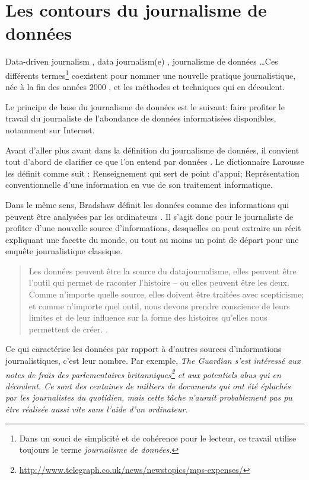 
\chapter{Les contours du journalisme de données}


\og Data-driven journalism \fg, \og data journalism(e) \fg, \og journalisme de données
 \fg\dots Ces différents 
termes\footnote{Dans un souci de simplicité et de cohérence pour le lecteur, ce travail
utilise toujours 
le terme \em journalisme de données\em.} 
coexistent pour nommer une nouvelle pratique journalistique, née à la fin des années 2000 \cite{bradshaw}, et les 
méthodes et techniques qui en découlent. 

Le principe de base du journalisme de données est le suivant: faire profiter le travail 
du journaliste de l'abondance de données informatisées disponibles, notamment sur 
Internet. 

Avant d'aller plus avant dans la définition du journalisme de données, il convient tout
d'abord de clarifier ce que l'on entend par \og données \fg.
Le dictionnaire Larousse les définit comme suit : \og Renseignement qui sert de point 
d'appui; Représentation conventionnelle d'une information en vue de son traitement 
informatique.\fg

Dans le même sens, Bradshaw définit les données comme \og des informations qui peuvent 
être analysées par les ordinateurs \fg \cite{bradshaw}. Il s'agit donc pour le 
journaliste de profiter d'une nouvelle source d'informations, desquelles on 
peut extraire un récit expliquant une facette du monde, ou tout au moins un 
point de départ pour une enquête journalistique classique. 


\begin{quote}
\og Les données peuvent être la source du datajournalisme, elles peuvent être l'outil 
qui permet de raconter l'histoire -- ou elles peuvent être les deux. 
Comme n'importe quelle source, elles doivent être traitées avec scepticisme; et comme 
n'importe quel outil, nous devons prendre conscience de leurs limites et de leur 
influence sur la forme des histoires qu'elles nous permettent de créer. \fg  %
\cite{handbookfr}.
\end{quote}

Ce qui caractérise les données par rapport à d'autres sources d'informations 
journalistiques, c'est leur nombre. Par exemple, \em The Guardian \em s'est 
intéressé aux notes de frais des parlementaires britanniques\footnote{\url{http://www.telegraph.co.uk/news/newstopics/mps-expenses/}} 
et aux potentiels abus qui en 
découlent. Ce sont des centaines de milliers de documents qui ont été épluchés par les 
journalistes du quotidien, mais cette tâche n'aurait probablement pas pu être
réalisée aussi vite sans l'aide d'un ordinateur.

